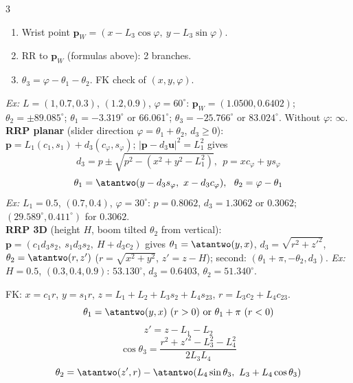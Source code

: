 \begin{multicols}{3}
\begin{recipe}
\begin{enumerate}
\item Wrist point $\mathbf p_W=(x-L_3\cos\varphi,\ y-L_3\sin\varphi)$.
\item RR to $\mathbf p_W$ (formulas above): 2 branches.
\item $\theta_3=\varphi-\theta_1-\theta_2$. FK check of $(x,y,\varphi)$.
\end{enumerate}
\end{recipe}
\textit{Ex:} $L=(1,0.7,0.3)$, $(1.2,0.9)$, $\varphi=60^\circ$: $\mathbf p_W=(1.0500,0.6402)$; $\theta_2=\pm89.085^\circ$; $\theta_1=-3.319^\circ$ or $66.061^\circ$; $\theta_3=-25.766^\circ$ or $83.024^\circ$. Without $\varphi$: $\infty$. \chk\\
\textbf{RRP planar} (slider direction $\varphi=\theta_1+\theta_2$, $d_3\ge0$): $\mathbf p=L_1(c_1,s_1)+d_3(c_\varphi,s_\varphi)$; $|\mathbf p-d_3\mathbf u|^2=L_1^2$ gives
\[d_3=p\pm\sqrt{p^2-(x^2+y^2-L_1^2)},\ \ p=xc_\varphi+ys_\varphi\]\[\theta_1=\atantwo(y-d_3s_\varphi,\ x-d_3c_\varphi),\ \ \theta_2=\varphi-\theta_1\]
\textit{Ex:} $L_1=0.5$, $(0.7,0.4)$, $\varphi=30^\circ$: $p=0.8062$, $d_3=1.3062$ or $0.3062$; $(29.589^\circ,0.411^\circ)$ for $0.3062$. \chk\\
\textbf{RRP 3D} (height $H$, boom tilted $\theta_2$ from vertical): $\mathbf p=(c_1d_3s_2,\ s_1d_3s_2,\ H+d_3c_2)$ gives
$\theta_1=\atantwo(y,x)$, $d_3=\sqrt{r^2+z'^2}$, $\theta_2=\atantwo(r,z')$ ($r=\sqrt{x^2+y^2}$, $z'=z-H$); second: $(\theta_1+\pi,-\theta_2,d_3)$. \textit{Ex:} $H=0.5$, $(0.3,0.4,0.9)$: $53.130^\circ$, $d_3=0.6403$, $\theta_2=51.340^\circ$. \chk

\label{w3:q3box}
\begin{fbx}
FK: $x=c_1r$, $y=s_1r$, $z=L_1+L_2+L_3s_2+L_4s_{23}$, $r=L_3c_2+L_4c_{23}$.
\[\theta_1=\atantwo(y,x)\ (r>0)\text{ or }\theta_1+\pi\ (r<0)\]\[z'=z-L_1-L_2\]
\[\cos\theta_3=\frac{r^2+z'^2-L_3^2-L_4^2}{2L_3L_4}\]\[\theta_2=\atantwo(z',r)-\atantwo(L_4\sin\theta_3,\ L_3+L_4\cos\theta_3)\]
\end{fbx}


\end{multicols}
